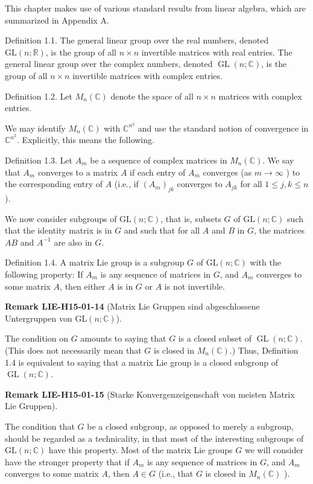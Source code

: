 \documentclass[10pt, letterpaper]{article}
\newcommand{\C}{\mathbb{C}}
\newcommand{\GL}{\mathrm{GL}}
\newcommand{\CustomHeading}[3]{%
  \par\medskip\noindent%
  \textbf{#1 #2} \textnormal{(#3)}.\enskip%
}
\newenvironment{REM}[2]{\begin{unitbox}\CustomHeading{Remark}{#1}{#2}}{\end{unitbox}}
\begin{document}
This chapter makes use of various standard results from linear algebra, which are summarized in Appendix A.

Definition 1.1. The general linear group over the real numbers, denoted $\mathrm{GL}(n ; \mathbb{R})$, is the group of all $n \times n$ invertible matrices with real entries. The general linear group over the complex numbers, denoted $\operatorname{GL}(n ; \mathbb{C})$, is the group of all $n \times n$ invertible matrices with complex entries.

Definition 1.2. Let $M_{n}(\mathbb{C})$ denote the space of all $n \times n$ matrices with complex entries.

We may identify $M_{n}(\mathbb{C})$ with $\mathbb{C}^{n^{2}}$ and use the standard notion of convergence in $\mathbb{C}^{n^{2}}$. Explicitly, this means the following.

Definition 1.3. Let $A_{m}$ be a sequence of complex matrices in $M_{n}(\mathbb{C})$. We say that $A_{m}$ converges to a matrix $A$ if each entry of $A_{m}$ converges (as $m \rightarrow \infty$ ) to the corresponding entry of $A$ (i.e., if $\left(A_{m}\right)_{j k}$ converges to $A_{j k}$ for all $1 \leq j, k \leq n$ ).

We now consider subgroups of $\mathrm{GL}(n ; \mathbb{C})$, that is, subsets $G$ of $\mathrm{GL}(n ; \mathbb{C})$ such that the identity matrix is in $G$ and such that for all $A$ and $B$ in $G$, the matrices $A B$ and $A^{-1}$ are also in $G$.

Definition 1.4. A matrix Lie group is a subgroup $G$ of $\mathrm{GL}(n ; \mathbb{C})$ with the following property: If $A_{m}$ is any sequence of matrices in $G$, and $A_{m}$ converges to some matrix $A$, then either $A$ is in $G$ or $A$ is not invertible.

\begin{REM}{LIE-H15-01-14}{Matrix Lie Gruppen sind abgeschlossene Untergruppen von $\GL(n;\C)$}
The condition on $G$ amounts to saying that $G$ is a closed subset of $\operatorname{GL}(n ; \mathbb{C})$. (This does not necessarily mean that $G$ is closed in $M_{n}(\mathbb{C})$.) Thus, Definition 1.4 is equivalent to saying that a matrix Lie group is a closed subgroup of $\operatorname{GL}(n ; \mathbb{C})$.
\end{REM}

\begin{REM}{LIE-H15-01-15}{Starke Konvergenzeigenschaft von meisten Matrix Lie Gruppen}
The condition that $G$ be a closed subgroup, as opposed to merely a subgroup, should be regarded as a technicality, in that most of the interesting subgroups of $\mathrm{GL}(n ; \mathbb{C})$ have this property. Most of the matrix Lie groups $G$ we will consider have the stronger property that if $A_{m}$ is any sequence of matrices in $G$, and $A_{m}$ converges to some matrix $A$, then $A \in G$ (i.e., that $G$ is closed in $M_{n}(\mathbb{C})$ ).
\end{REM}
\end{document}
